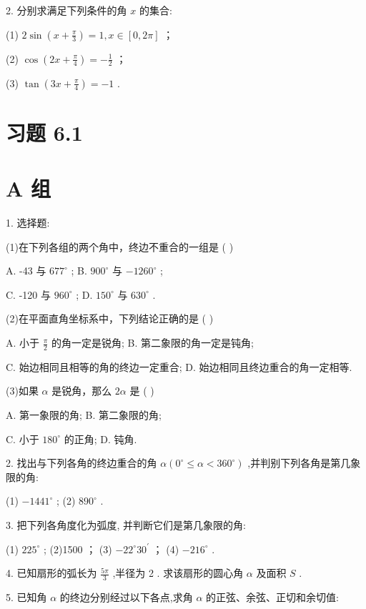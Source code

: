 \documentclass[10pt]{article}
\begin{document}
2. 分别求满足下列条件的角 \(x\) 的集合:

(1) \(2\sin \left( {x + \frac{\pi }{3}}\right)  = 1,x \in  \left\lbrack  {0,{2\pi }}\right\rbrack\) ；

(2) \(\cos \left( {{2x} + \frac{\pi }{4}}\right)  =  - \frac{1}{2}\) ；

(3) \(\tan \left( {{3x} + \frac{\pi }{4}}\right)  =  - 1\) .

\section*{习题 6.1}

\section*{A 组}

1. 选择题:

(1)在下列各组的两个角中，终边不重合的一组是 ( )

A. -43 \textdegree 与 \({677}^{ \circ  }\) ; B. \({900}^{ \circ  }\) 与 \(- {1260}^{ \circ  }\) ;

C. -120 \textdegree 与 \({960}^{ \circ  }\) ; D. \({150}^{ \circ  }\) 与 \({630}^{ \circ  }\) .

(2)在平面直角坐标系中，下列结论正确的是 ( )

A. 小于 \(\frac{\pi }{2}\) 的角一定是锐角; B. 第二象限的角一定是钝角;

C. 始边相同且相等的角的终边一定重合; D. 始边相同且终边重合的角一定相等.

(3)如果 \(\alpha\) 是锐角，那么 \({2\alpha }\) 是 ( )

A. 第一象限的角; B. 第二象限的角;

C. 小于 \({180}^{ \circ  }\) 的正角; D. 钝角.

2. 找出与下列各角的终边重合的角 \(\alpha \left( {{0}^{ \circ  } \leq  \alpha  < {360}^{ \circ  }}\right)\) ,并判别下列各角是第几象限的角:

(1) \(- {1441}^{ \circ  }\) ; (2) \({890}^{ \circ  }\) .

3. 把下列各角度化为弧度, 并判断它们是第几象限的角:

(1) \({225}^{ \circ  }\) ; (2)1500 \textdegree ； (3) \(- {22}^{ \circ  }{30}^{\prime }\) ； (4) \(- {216}^{ \circ  }\) .

4. 已知扇形的弧长为 \(\frac{5\pi }{3}\) ,半径为 2 . 求该扇形的圆心角 \(\alpha\) 及面积 \(S\) .

5. 已知角 \(\alpha\) 的终边分别经过以下各点,求角 \(\alpha\) 的正弦、余弦、正切和余切值:
\end{document}
